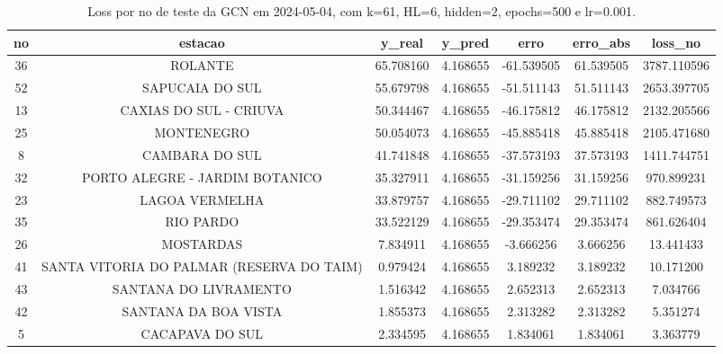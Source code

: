 \begin{table}[h]
\centering
\caption{Loss por no de teste da GCN em 2024-05-04, com k=61, HL=6, hidden=2, epochs=500 e lr=0.001.}
\label{tab:gcn_loss_k61_hl6_h2_e500_d20240504}
\begin{tabular}{ccccccc}
\toprule
no & estacao & y\_real & y\_pred & erro & erro\_abs & loss\_no \\
\midrule
36 & ROLANTE & 65.708160 & 4.168655 & -61.539505 & 61.539505 & 3787.110596 \\
52 & SAPUCAIA DO SUL & 55.679798 & 4.168655 & -51.511143 & 51.511143 & 2653.397705 \\
13 & CAXIAS DO SUL - CRIUVA & 50.344467 & 4.168655 & -46.175812 & 46.175812 & 2132.205566 \\
25 & MONTENEGRO & 50.054073 & 4.168655 & -45.885418 & 45.885418 & 2105.471680 \\
8 & CAMBARA DO SUL & 41.741848 & 4.168655 & -37.573193 & 37.573193 & 1411.744751 \\
32 & PORTO ALEGRE - JARDIM BOTANICO & 35.327911 & 4.168655 & -31.159256 & 31.159256 & 970.899231 \\
23 & LAGOA VERMELHA & 33.879757 & 4.168655 & -29.711102 & 29.711102 & 882.749573 \\
35 & RIO PARDO & 33.522129 & 4.168655 & -29.353474 & 29.353474 & 861.626404 \\
26 & MOSTARDAS & 7.834911 & 4.168655 & -3.666256 & 3.666256 & 13.441433 \\
41 & SANTA VITORIA DO PALMAR (RESERVA DO TAIM) & 0.979424 & 4.168655 & 3.189232 & 3.189232 & 10.171200 \\
43 & SANTANA DO LIVRAMENTO & 1.516342 & 4.168655 & 2.652313 & 2.652313 & 7.034766 \\
42 & SANTANA DA BOA VISTA & 1.855373 & 4.168655 & 2.313282 & 2.313282 & 5.351274 \\
5 & CACAPAVA DO SUL & 2.334595 & 4.168655 & 1.834061 & 1.834061 & 3.363779 \\
\bottomrule
\end{tabular}
\end{table}
